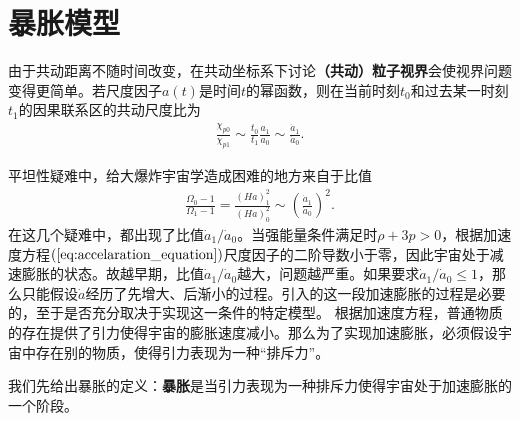 \section{暴胀模型}
由于共动距离不随时间改变，在共动坐标系下讨论\textbf{（共动）粒子视界}会使视界问题变得更简单。若尺度因子$a(t)$是时间$t$的幂函数，则在当前时刻$t_0$和过去某一时刻$t_1$的因果联系区的共动尺度比为
\begin{align}
  \frac{\chi_{p 0}}{\chi_{p 1}}\sim \frac{t_0}{t_1}\frac{a_1}{a_0}
  \sim \frac{\dot{a}_1}{\dot{a}_0}.
\end{align}

平坦性疑难中，给大爆炸宇宙学造成困难的地方来自于比值
\begin{align}
  \label{eq:flatness-of-space}
  \frac{\Omega_0-1}{\Omega_1-1}=
  \frac{{\left(Ha\right)}^2_{1}}{{\left(Ha\right)}^2_{0}}
  \sim {\left(\frac{\dot{a}_1}{\dot{a}_0}\right)}^2.
\end{align}
在这几个疑难中，都出现了比值$\dot{a}_1 /
\dot{a}_0$。当强能量条件满足时$\rho+3p>0$，根据加速度方程$(\ref{eq:accelaration_equation})$尺度因子的二阶导数小于零，因此宇宙处于减速膨胀的状态。故越早期，比值$\dot{a}_1
/\dot{a}_0$越大，问题越严重。如果要求$\dot{a}_1
/\dot{a}_0\leq
1$，那么只能假设$\dot{a}$经历了先增大、后渐小的过程。引入的这一段加速膨胀的过程是必要的，至于是否充分取决于实现这一条件的特定模型。
根据加速度方程，普通物质的存在提供了引力使得宇宙的膨胀速度减小。那么为了实现加速膨胀，必须假设宇宙中存在别的物质，使得引力表现为一种“排斥力”。

我们先给出暴胀的定义：\textbf{暴胀}是当引力表现为一种排斥力使得宇宙处于加速膨胀的一个阶段。

